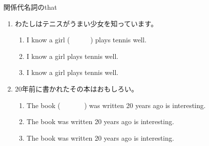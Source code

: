 \documentclass[aspectratio=169,xcolor={dvipsnames,table}]{beamer}
\begin{document}
\begin{frame}[plain]{関係代名詞のthat}
 \begin{enumerate}
  \item<1-> わたしはテニスがうまい少女を知っています。
	\begin{enumerate}
	 \item<1-> I know a girl (~~~~~~) plays tennis well.
	 \item<2-> I know a girl  plays tennis well.
	 \item<5-> I know a girl  plays tennis well.
	\end{enumerate}
  \item<1-> 20年前に書かれたその本はおもしろい。
       \begin{enumerate}
	\item<1-> The book (~~~~~~~) was written 20 years ago is interesting.
	\item<3->  The book  was written 20 years ago is interesting.
	\item<6->  The book  was written 20 years ago is interesting.
       \end{enumerate}
 \end{enumerate}

\end{frame}
\end{document}
